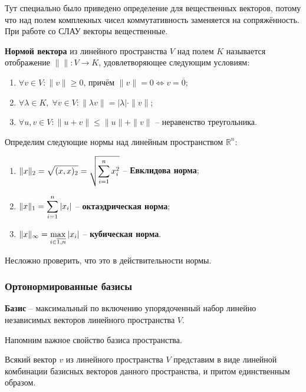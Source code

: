 \documentclass{article}
\begin{document}
Тут специально было приведено определение для вещественных векторов, потому что
над полем комплекных чисел коммутативность заменяется на сопряжённость. При
работе со СЛАУ векторы вещественные.

\begin{define}\label{eq:vector_norm}
	\textbf{Нормой вектора} из линейного пространства $V$ над полем $K$
	называется отображение $\|\|: V\rightarrow K$, удовлетворяющее
	следующим условиям:
	\begin{enumerate}[nosep]
		\item $\forall v\in V: \|v\|\ge 0$, причём $\|v\|=0
			\Leftrightarrow v=\overline{0}$;
		\item $\forall \lambda\in K,\;\forall v\in V:
			\|\lambda v\|=|\lambda|\cdot\|v\|$;
		\item $\forall u,v\in V: \|u+v\|\le\|u\|+\|v\|$ -- неравенство
			треугольника.
	\end{enumerate}
\end{define}

\begin{define}\label{eq:some_vector_norms}
	Определим следующие нормы над линейным пространством $\mathbb R^n$:
	\begin{enumerate}[nosep]
		\item $\mathlarger{\|x\|_2=\sqrt{(x,x)_2}=\sqrt{\sum_{i=1}^{n}
			x_i^2}}$ -- \textbf{Евклидова норма};
		\item $\mathlarger{\|x\|_1=\sum_{i=1}^{n}|x_i|}$ --
			\textbf{октаэдрическая норма}; \\
		\item $\mathlarger{\|x\|_\infty=\max_{i\in\overline{1,n}}
			|x_i|}$ -- \textbf{кубическая норма}.
	\end{enumerate}
\end{define}

Несложно проверить, что это в действительности нормы.

\subsubsection{Ортонормированные базисы}
\begin{define}
	\textbf{Базис} -- максимальный по включению упорядоченный набор линейно
	независимых векторов линейного пространства $V$.
\end{define}

Напомним важное свойство базиса пространства.
\begin{theorem}
	Всякий вектор $v$ из линейного пространства $V$ представим в виде
	линейной комбинации базисных векторов данного пространства, и притом
	единственным образом.
\end{theorem}
\end{document}
